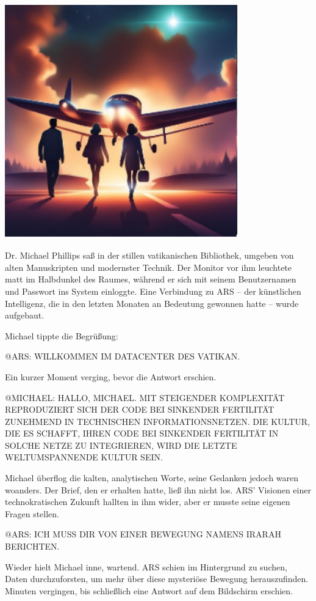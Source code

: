 \documentclass[
]{article}
\begin{document}
\includegraphics[width=3.9651in,height=3.9956in]{media/image7.png}

Dr. Michael Phillips saß in der stillen vatikanischen Bibliothek,
umgeben von alten Manuskripten und modernster Technik. Der Monitor vor
ihm leuchtete matt im Halbdunkel des Raumes, während er sich mit seinem
Benutzernamen und Passwort ins System einloggte. Eine Verbindung zu ARS
-- der künstlichen Intelligenz, die in den letzten Monaten an Bedeutung
gewonnen hatte -- wurde aufgebaut.

Michael tippte die Begrüßung:

@ARS: WILLKOMMEN IM DATACENTER DES VATIKAN.

Ein kurzer Moment verging, bevor die Antwort erschien.

@MICHAEL: HALLO, MICHAEL. MIT STEIGENDER KOMPLEXITÄT REPRODUZIERT SICH
DER CODE BEI SINKENDER FERTILITÄT ZUNEHMEND IN TECHNISCHEN
INFORMATIONSNETZEN. DIE KULTUR, DIE ES SCHAFFT, IHREN CODE BEI SINKENDER
FERTILITÄT IN SOLCHE NETZE ZU INTEGRIEREN, WIRD DIE LETZTE
WELTUMSPANNENDE KULTUR SEIN.

Michael überflog die kalten, analytischen Worte, seine Gedanken jedoch
waren woanders. Der Brief, den er erhalten hatte, ließ ihn nicht los.
ARS' Visionen einer technokratischen Zukunft hallten in ihm wider, aber
er musste seine eigenen Fragen stellen.

@ARS: ICH MUSS DIR VON EINER BEWEGUNG NAMENS IRARAH BERICHTEN.

Wieder hielt Michael inne, wartend. ARS schien im Hintergrund zu suchen,
Daten durchzuforsten, um mehr über diese mysteriöse Bewegung
herauszufinden. Minuten vergingen, bis schließlich eine Antwort auf dem
Bildschirm erschien.
\end{document}
